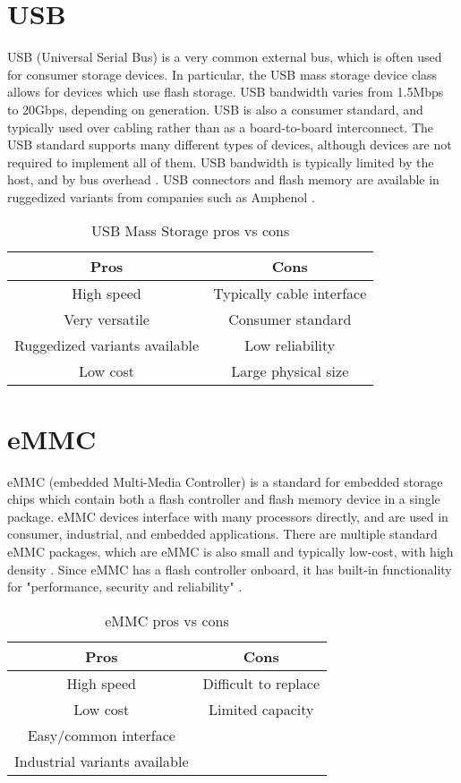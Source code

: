 \documentclass[12pt,article]{memoir}
\begin{document}
\section{USB}
USB (Universal Serial Bus) is a very common external bus, which is often used for consumer storage devices. In particular, the USB mass storage device class allows for devices which use flash storage. USB bandwidth varies from 1.5Mbps to 20Gbps, depending on generation. USB is also a consumer standard, and typically used over cabling rather than as a board-to-board interconnect. The USB standard supports many different types of devices, although devices are not required to implement all of them. USB bandwidth is typically limited by the host, and by bus overhead \cite{wiki:USB}. USB connectors and flash memory are available in ruggedized variants from companies such as Amphenol \cite{amphenol:ruggedusb}.
\begin{table}[H]
	\centering
	\begin{tabu}{c | c}
		Pros & Cons \\ \hline
		High speed & Typically cable interface\\
		Very versatile & Consumer standard\\
		Ruggedized variants available & Low reliability\\
		Low cost & Large physical size\\
	\end{tabu}
	\caption{USB Mass Storage pros vs cons}
\end{table}

\section{eMMC}
eMMC (embedded Multi-Media Controller) is a standard for embedded storage chips which contain both a flash controller and flash memory device in a single package. eMMC devices interface with many processors directly, and are used in consumer, industrial, and embedded applications. There are multiple standard eMMC packages, which are  eMMC is also small and typically low-cost, with high density \cite{kingston:emmc}. Since eMMC has a flash controller onboard, it has built-in functionality for "performance, security and reliability" \cite{datalight:emmc}. 
\begin{table}[H]
	\centering
	\begin{tabu}{c | c}
		Pros & Cons \\ \hline
		High speed & Difficult to replace\\
		Low cost & Limited capacity\\
		Easy/common interface & \\
		Industrial variants available & 
	\end{tabu}
	\caption{eMMC pros vs cons}
\end{table}
\end{document}
